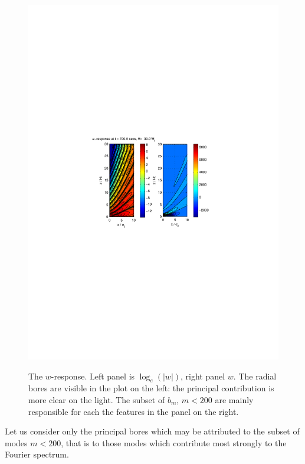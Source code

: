 \documentclass[12pt]{article}
\begin{document}
%
%
%
\begin{figure}[h]
\caption{The $w$-response. Left panel is $\log_e(|w|)$, right panel $w$. The radial bores are visible in the plot on the left: the principal contribution is more clear on the light. 
The subset of $b_m$, $m<200$ are mainly responsible for each the features in the panel on the right. } 
\includegraphics[scale=1.0,angle=-0] {fig2.pdf} 
\label{fig_2}
\end{figure}
%
%
%
Let us consider only the principal bores which may be attributed to the subset of modes $m < 200$, that is to those modes which contribute most strongly to the Fourier spectrum.
\end{document}
